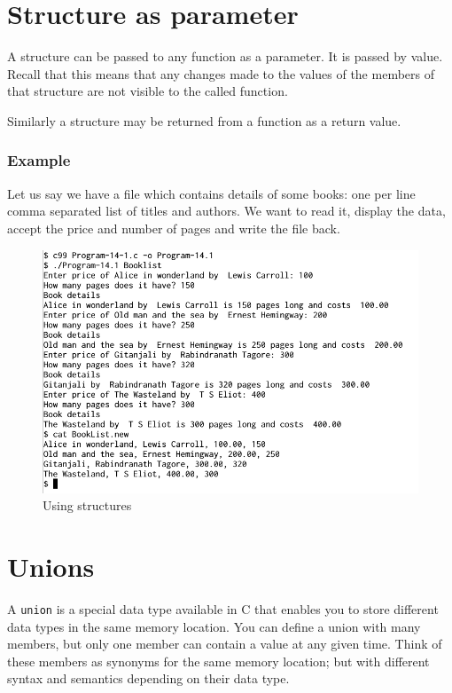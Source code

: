 \documentclass[11pt,a4paper]{article}
\begin{document}
\section*{Structure as parameter}
A structure can be passed to any function as a parameter. It is passed by value. Recall that this means that any changes made to the values of the members of that structure are not visible to the called function. 

Similarly a structure may be returned from a function as a return value.

\subsubsection*{Example}

Let us say we have a file which contains details of some books: one per line comma separated list of titles and authors. We want to read it, display the data, accept the price and number of pages and write the file back.



\begin{figure}[ht]
\begin{center}
\includegraphics[scale=0.5]{Output-14-1.png}
\caption{Using structures}
\label{output-14-1}
\end{center}
\end{figure}

\section*{Unions}
A \lstinline!union! is a special data type available in C that enables you to store different data types in the same memory location. You can define a union with many members, but only one member can contain a value at any given time. Think of these members as synonyms for the same memory location; but with different syntax and semantics depending on their data type. 
\end{document}
